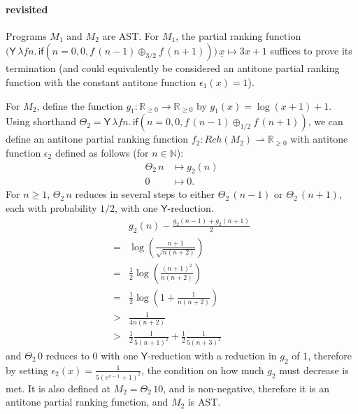 \documentclass{article}
\newcommand{\nnReal}{\mathbb{R}_{{\geq}0}}
\newcommand{\tY}{\mathsf{Y}}
\newcommand{\tif}[3]{\mathsf{if}(#1, #2, #3)} %
\theoremstyle{definition}
\theoremstyle{lemma}
\theoremstyle{remark}
\begin{document}
\paragraph{ revisited}

Programs $M_1$ and $M_2$ are AST. For $M_1$, the partial ranking function $\big(\tY \, \lambda f n . \, \tif{n=0}{0}{f \, (n-1) \oplus_{3/2} f \, (n+1)}\big) \, \underline x \mapsto 3x + 1$ suffices to prove its termination (and could equivalently be considered an antitone partial ranking function with the constant antitone function $\epsilon_1(x) = 1$).

For $M_2$, define the function $g_1 : \nnReal \to \nnReal$ by $g_1(x) = \log(x+1) + 1$.
Using shorthand 
$\Theta_2 = \tY \, \lambda f n . \, 
\tif{n = 0}{0}{f \, (n - 1) \oplus_{1/2} f \, (n + 1)}$, 
we can define an antitone partial ranking function $f_2 : \mathit{Rch}(M_2) \rightharpoonup \nnReal$ with antitone function $\epsilon_2$ defined as follows (for $n \in \mathbb N$):
\begin{align*}
{\Theta_2} \, n 
&\mapsto 
g_2(n)
\\
0 &\mapsto 0.
\end{align*}
For $n \geq 1$, $\Theta_2 \, n$ reduces in several steps to either $\Theta_2 \, (n-1)$ or $\Theta_2 \, (n+1)$, each with probability $1/2$, with one $\tY$-reduction.
\begin{align*}
  & g_2(n) - \frac{g_2(n-1) + g_2(n+1)} 2 \\
  = & \log(\frac{n+1}{\sqrt{n(n+2)}}) \\
  = & \frac 1 2 \log(\frac{(n+1)^2}{n(n+2)}) \\
  = & \frac 1 2 \log(1 + \frac 1 {n(n+2)}) \\
  > & \frac 1 {4n(n+2)} \\
  > & \frac 1 2 \frac 1 {5(n+1)^2} + \frac 1 2 \frac 1 {5(n+3)^2}
\end{align*}
and $\Theta_2 \, 0$ reduces to $0$ with one $\tY$-reduction with a reduction in $g_2$ of $1$, therefore by setting $\epsilon_2(x) = \frac 1 {5(e^{x-1}+1)^2}$, the condition on how much $g_2$ must decrease is met. It is also defined at $M_2 = \Theta_2 \, 10$, and is non-negative, therefore it is an antitone partial ranking function, and $M_2$ is AST.
\end{document}
